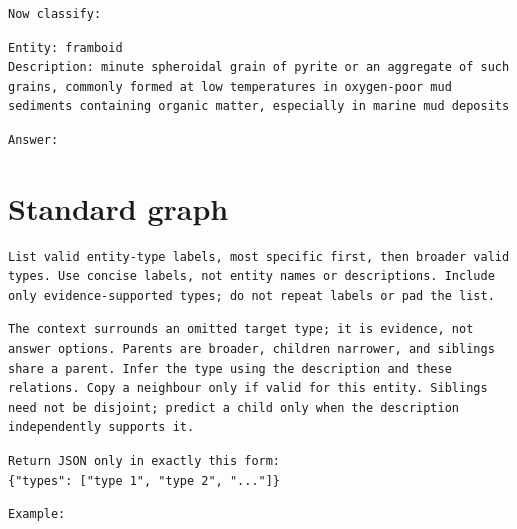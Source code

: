 \begin{Verbatim}[fontsize=\footnotesize,breaklines=true,breakanywhere=true]
Now classify:
\end{Verbatim}

\begin{Verbatim}[fontsize=\footnotesize,breaklines=true,breakanywhere=true]
Entity: framboid
Description: minute spheroidal grain of pyrite or an aggregate of such grains, commonly formed at low temperatures in oxygen-poor mud sediments containing organic matter, especially in marine mud deposits
\end{Verbatim}

\begin{Verbatim}[fontsize=\footnotesize,breaklines=true,breakanywhere=true]
Answer:
\end{Verbatim}

\clearpage

\section{Standard graph}

\begin{Verbatim}[fontsize=\footnotesize,breaklines=true,breakanywhere=true]
List valid entity-type labels, most specific first, then broader valid types. Use concise labels, not entity names or descriptions. Include only evidence-supported types; do not repeat labels or pad the list.
\end{Verbatim}

\begin{Verbatim}[fontsize=\footnotesize,breaklines=true,breakanywhere=true]
The context surrounds an omitted target type; it is evidence, not answer options. Parents are broader, children narrower, and siblings share a parent. Infer the type using the description and these relations. Copy a neighbour only if valid for this entity. Siblings need not be disjoint; predict a child only when the description independently supports it.
\end{Verbatim}

\begin{Verbatim}[fontsize=\footnotesize,breaklines=true,breakanywhere=true]
Return JSON only in exactly this form:
{"types": ["type 1", "type 2", "..."]}
\end{Verbatim}

\begin{Verbatim}[fontsize=\footnotesize,breaklines=true,breakanywhere=true]
Example:
\end{Verbatim}

